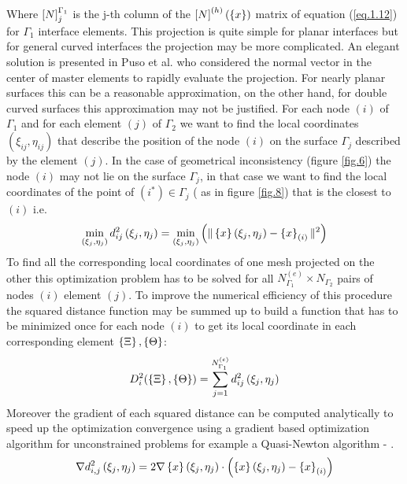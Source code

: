      Where $\left[{N}\right]_{j}^{\Gamma_1}$ is the j-th column of the $\left[{N}\right]^{(h)}(\left\lbrace{x}\right \rbrace)$ matrix of equation (\ref{eq.1.12}) for ${\Gamma_1}$ interface elements. This projection is quite simple for planar interfaces but for general curved interfaces the projection may be more complicated. An elegant solution is presented in Puso et al. \cite{puso20043d} who considered the normal vector in the center of master elements to rapidly evaluate the projection. For nearly planar surfaces this can be a reasonable approximation, on the other hand, for double curved surfaces this approximation may not be justified.
     For each node $(i)$ of $\Gamma_1$ and for each element $(j)$ of $\Gamma_2$ we want to find the local coordinates $(\xi_{ij},\eta_{ij})$ that describe the position of the node $(i)$ on the surface $\Gamma_j$ described by the element $(j)$. In the case of geometrical inconsistency (figure \ref{fig.6}) the node $(i)$ may not lie on the surface $\Gamma_j$, in that case we want to find the local coordinates of the point of $(i^*) \in \Gamma_j$ ( as in figure \ref{fig.8}) that is the closest to $(i)$ i.e.
     \begin{equation}
     \label{eq.43}
     \min_{\left(\xi_{j},\eta_{j}\right)}d^2_{ij}\left(\xi_{j},\eta_{j}\right)=\min_{\left(\xi_{j},\eta_{j}\right)}\left( \|\left\lbrace{x}\right \rbrace\left(\xi_{j},\eta_{j}\right)-\left\lbrace{x}\right \rbrace_{(i)} \|^2\right)
     \end{equation}
     To find all the corresponding local coordinates of one mesh projected on the other this optimization problem has to be solved for all $N^{(e)}_{\Gamma_1}\times N_{\Gamma_2}$ pairs of nodes $(i)$ element $(j)$. To improve the numerical efficiency of this procedure the squared distance function may be summed up to build a function that has to be minimized once for each node $(i)$ to get its local coordinate in each corresponding element $\left\lbrace{\Xi}\right \rbrace,\left\lbrace{\Theta}\right \rbrace$:
     \begin{equation}
     \label{eq.44}
     D_{i}^2(\left\lbrace{\Xi}\right \rbrace,\left\lbrace{\Theta}\right \rbrace)=\sum_{j=1}^{N^{(e)}_{\Gamma_1}}d^2_{ij}\left(\xi_{j},\eta_{j}\right)
     \end{equation}
     Moreover the gradient of each squared distance can be computed analytically to speed up the optimization convergence using a gradient based optimization algorithm for unconstrained problems for example a Quasi-Newton algorithm \cite{dennis1977quasi,davidon1959aec}- \cite{fletcher1963rapidly,dennis1996numerical}.
     \begin{equation}
     \label{eq.45}
     \nabla d_{i,j}^2 \left(\xi_{j},\eta_{j}\right)=2\nabla\left\lbrace{x}\right \rbrace\left(\xi_{j},\eta_{j}\right)\cdot\left( \left\lbrace{x}\right \rbrace\left(\xi_{j},\eta_{j}\right)-\left\lbrace{x}\right \rbrace_{(i)}\right)
     \end{equation}
